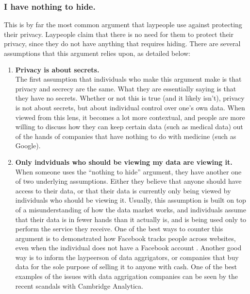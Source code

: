 \subsubsection{I have nothing to hide.}

This is by far the most common argument that laypeople use against protecting their privacy. Laypeople claim that there is no need for them to protect their privacy, since they do not have anything that requires hiding. There are several assumptions that this argument relies upon, as detailed below:

\begin{enumerate}
\item \textbf{Privacy is about secrets.} \\
The first assumption that individuals who make this argument make is that privacy and secrecy are the same. What they are essentially saying is that they have no secrets. Whether or not this is true (and it likely isn't), privacy is not about secrets, but about individual control over one's own data. When viewed from this lens, it becomes a lot more contextual, and people are more willing to discuss how they can keep certain data (such as medical data) out of the hands of companies that have nothing to do with medicine (such as Google).

\item \textbf{Only indviduals who should be viewing my data are viewing it.} \\
    When someone uses the ``nothing to hide'' argument, they have another one of two underlying assumptions. Either they believe that anyone should have access to their data, or that their data is currently only being viewed by individuals who should be viewing it. Usually, this assumption is built on top of a misunderstanding of how the data market works, and individuals assume that their data is in fewer hands than it actually is, and is being used only to perform the service they receive. One of the best ways to counter this argument is to demonstrated how Facebook tracks people across websites, even when the individual does not have a Facebook account \cite{facebooktracking}. Another good way is to inform the laypeerson of data aggrigators, or companies that buy data for the sole purpose of selling it to anyone with cash. One of the best examples of the issues with data aggrigation companies can be seen by the recent scandals with Cambridge Analytica.


\end{enumerate}
